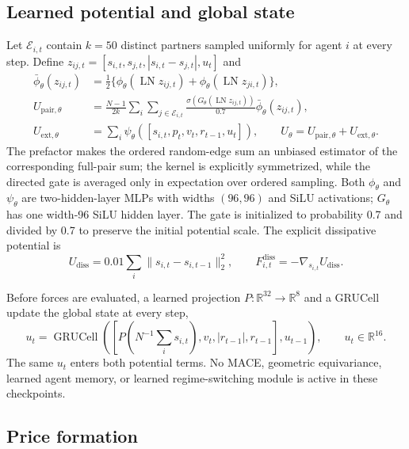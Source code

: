 \documentclass{article}
\begin{document}
\subsection{Learned potential and global state}

Let $\mathcal{E}_{i,t}$ contain $k=50$ distinct partners sampled uniformly for agent $i$ at every
step. Define $z_{ij,t}=[s_{i,t},s_{j,t},|s_{i,t}-s_{j,t}|,u_t]$ and
\begin{align}
\bar\phi_\theta(z_{ij,t})
  &=\tfrac12\{\phi_\theta(\operatorname{LN}z_{ij,t})
                 +\phi_\theta(\operatorname{LN}z_{ji,t})\},\\
U_{\mathrm{pair},\theta}
  &=\frac{N-1}{2k}\sum_i\sum_{j\in\mathcal{E}_{i,t}}
    \frac{\sigma(G_\theta(\operatorname{LN}z_{ij,t}))}{0.7}
    \bar\phi_\theta(z_{ij,t}),\\
U_{\mathrm{ext},\theta}
  &=\sum_i\psi_\theta([s_{i,t},p_t,v_t,r_{t-1},u_t]),\qquad
U_\theta=U_{\mathrm{pair},\theta}+U_{\mathrm{ext},\theta}.
\end{align}
The prefactor makes the ordered random-edge sum an unbiased estimator of the corresponding full-pair
sum; the kernel is explicitly symmetrized, while the directed gate is averaged only in expectation
over ordered sampling. Both $\phi_\theta$ and $\psi_\theta$ are two-hidden-layer MLPs with widths $(96,96)$ and SiLU
activations; $G_\theta$ has one width-96 SiLU hidden layer. The gate is initialized to probability
0.7 and divided by 0.7 to preserve the initial potential scale. The explicit dissipative potential is
\begin{equation}
U_{\mathrm{diss}}=0.01\sum_i\lVert s_{i,t}-s_{i,t-1}\rVert_2^2,\qquad
F^{\mathrm{diss}}_{i,t}=-\nabla_{s_{i,t}}U_{\mathrm{diss}}.
\end{equation}

Before forces are evaluated, a learned projection $P:\mathbb{R}^{32}\to\mathbb{R}^{8}$ and a
GRUCell update the global state at every step,
\begin{equation}
u_t=\operatorname{GRUCell}\!\left(
 [P(N^{-1}\textstyle\sum_i s_{i,t}),v_t,|r_{t-1}|,r_{t-1}],u_{t-1}\right),
 \qquad u_t\in\mathbb{R}^{16}.
\end{equation}
The same $u_t$ enters both potential terms. No MACE, geometric equivariance, learned agent memory,
or learned regime-switching module is active in these checkpoints.

\subsection{Price formation}
\end{document}
